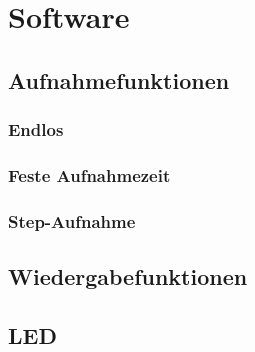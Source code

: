 \newpage
\section{Software}







\subsection{Aufnahmefunktionen}
\subsubsection{Endlos}
\subsubsection{Feste Aufnahmezeit}
\subsubsection{Step-Aufnahme}
\subsection{Wiedergabefunktionen}
\subsection{LED}



